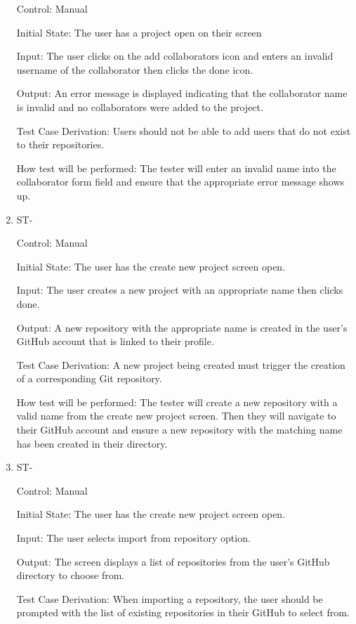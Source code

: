 \documentclass[12pt, titlepage]{article}
\newcounter{TESTID}
\newcommand\TESTNUM{\stepcounter{TESTID}\theTESTID}
\begin{document}
\begin{enumerate}
		Control: Manual
		
		Initial State: The user has a project open on their screen
		
		Input: The user clicks on the add collaborators icon and enters an invalid username of the collaborator then clicks the done icon.
		
		Output: An error message is displayed indicating that the collaborator name is invalid and no collaborators were added to the project.
		
		Test Case Derivation: Users should not be able to add users that do not exist to their repositories.
		
		How test will be performed: The tester will enter an invalid name into the collaborator form field and ensure that the appropriate error message shows up.
		
		\item{ST-\TESTNUM\\}
		
		Control: Manual
		
		Initial State: The user has the create new project screen open.
		
		Input: The user creates a new project with an appropriate name then clicks done.
		
		Output: A new repository with the appropriate name is created in the user's GitHub account that is linked to their profile. 
		
		Test Case Derivation: A new project being created must trigger the creation of a corresponding Git repository.
		
		How test will be performed: The tester will create a new repository with a valid name from the create new project screen. Then they will navigate to their GitHub account and ensure a new repository with the matching name has been created in their directory.
		
		\item{ST-\TESTNUM\\}
		
		Control: Manual
		
		Initial State: The user has the create new project screen open.
		
		Input: The user selects import from repository option.
		
		Output: The screen displays a list of repositories from the user's GitHub directory to choose from.
		
		Test Case Derivation: When importing a repository, the user should be prompted with the list of existing repositories in their GitHub to select from. 
		

\end{enumerate}
\end{document}
